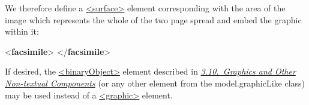 We therefore define a \hyperref[TEI.surface]{<surface>} element corresponding with the area of the image which represents the whole of the two page spread and embed the graphic within it: \par\bgroup{}\exampleFont \begin{shaded}\noindent\mbox{}{<\textbf{facsimile}>}\mbox{}\newline 
{}\mbox{}\newline 
\hspace*{1em}\mbox{}\newline 
{}\mbox{}\newline 
{</\textbf{facsimile}>}\end{shaded}\egroup\par \par
If desired, the \hyperref[TEI.binaryObject]{<binaryObject>} element described in \textit{\hyperref[COGR]{3.10.\ Graphics and Other Non-textual Components}} (or any other element from the \textsf{model.graphicLike} class) may be used instead of a \hyperref[TEI.graphic]{<graphic>} element.\par
